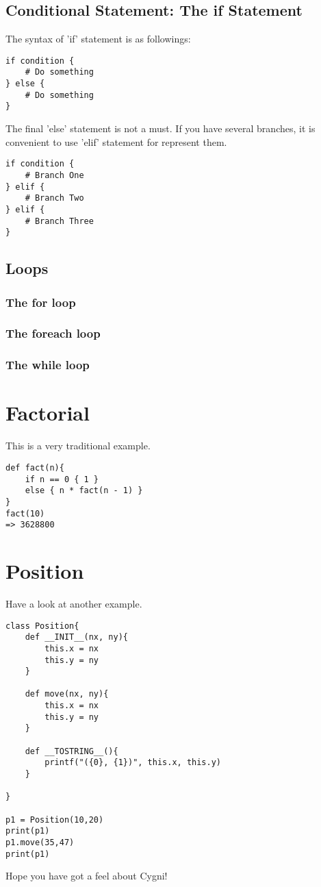 \subsection{Conditional Statement: The if Statement}
The syntax of 'if' statement is as followings:
\begin{lstlisting}
if condition {
	# Do something
} else {
	# Do something
}
\end{lstlisting}
The final 'else' statement is not a must. If you have several branches, it is convenient to use 'elif' statement for represent them. 
\begin{lstlisting}
if condition {
	# Branch One 
} elif {
	# Branch Two 
} elif {
	# Branch Three
} 
\end{lstlisting}

\subsection{Loops}
\subsubsection{The for loop} 
\subsubsection{The foreach loop}
\subsubsection{The while loop}
\section{Factorial}
This is a very traditional example. 


\begin{lstlisting}
def fact(n){
	if n == 0 { 1 }
	else { n * fact(n - 1) }
}
fact(10)
=> 3628800
\end{lstlisting}

\section{Position}
Have a look at another example.
\begin{lstlisting}
class Position{
	def __INIT__(nx, ny){
		this.x = nx
		this.y = ny
	}
	
	def move(nx, ny){
		this.x = nx
		this.y = ny
	}
	
	def __TOSTRING__(){
		printf("({0}, {1})", this.x, this.y)
	}
	
}

p1 = Position(10,20)
print(p1)
p1.move(35,47)
print(p1)
\end{lstlisting}	

Hope you have got a feel about Cygni!
